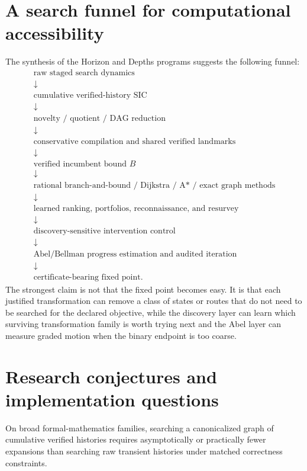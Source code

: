 \section{A search funnel for computational accessibility}
The synthesis of the Horizon and Depths programs suggests the following funnel:
\[
\begin{array}{c}
\text{raw staged search dynamics}\\[2pt]
\downarrow\\[2pt]
\text{cumulative verified-history SIC}\\[2pt]
\downarrow\\[2pt]
\text{novelty / quotient / DAG reduction}\\[2pt]
\downarrow\\[2pt]
\text{conservative compilation and shared verified landmarks}\\[2pt]
\downarrow\\[2pt]
\text{verified incumbent bound }B\\[2pt]
\downarrow\\[2pt]
\text{rational branch-and-bound / Dijkstra / A* / exact graph methods}\\[2pt]
\downarrow\\[2pt]
\text{learned ranking, portfolios, reconnaissance, and resurvey}\\[2pt]
\downarrow\\[2pt]
\text{discovery-sensitive intervention control}\\[2pt]
\downarrow\\[2pt]
\text{Abel/Bellman progress estimation and audited iteration}\\[2pt]
\downarrow\\[2pt]
\text{certificate-bearing fixed point.}
\end{array}
\]
The strongest claim is not that the fixed point becomes easy. It is that each justified transformation can remove a class of states or routes that do not need to be searched for the declared objective, while the discovery layer can learn which surviving transformation family is worth trying next and the Abel layer can measure graded motion when the binary endpoint is too coarse.

\section{Research conjectures and implementation questions}
\begin{conjecture}
On broad formal-mathematics families, searching a canonicalized graph of cumulative verified histories requires asymptotically or practically fewer expansions than searching raw transient histories under matched correctness constraints.
\end{conjecture}

